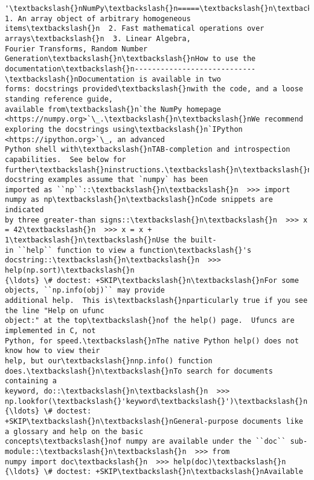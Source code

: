 \begin{tcolorbox}[breakable, size=fbox, boxrule=.5pt, pad at break*=1mm, opacityfill=0]
\begin{Verbatim}[commandchars=\\\{\}]
'\textbackslash{}nNumPy\textbackslash{}n=====\textbackslash{}n\textbackslash{}nProvides\textbackslash{}n  1. An array object of arbitrary homogeneous
items\textbackslash{}n  2. Fast mathematical operations over arrays\textbackslash{}n  3. Linear Algebra,
Fourier Transforms, Random Number Generation\textbackslash{}n\textbackslash{}nHow to use the
documentation\textbackslash{}n----------------------------\textbackslash{}nDocumentation is available in two
forms: docstrings provided\textbackslash{}nwith the code, and a loose standing reference guide,
available from\textbackslash{}n`the NumPy homepage <https://numpy.org>`\_.\textbackslash{}n\textbackslash{}nWe recommend
exploring the docstrings using\textbackslash{}n`IPython <https://ipython.org>`\_, an advanced
Python shell with\textbackslash{}nTAB-completion and introspection capabilities.  See below for
further\textbackslash{}ninstructions.\textbackslash{}n\textbackslash{}nThe docstring examples assume that `numpy` has been
imported as ``np``::\textbackslash{}n\textbackslash{}n  >>> import numpy as np\textbackslash{}n\textbackslash{}nCode snippets are indicated
by three greater-than signs::\textbackslash{}n\textbackslash{}n  >>> x = 42\textbackslash{}n  >>> x = x + 1\textbackslash{}n\textbackslash{}nUse the built-
in ``help`` function to view a function\textbackslash{}'s docstring::\textbackslash{}n\textbackslash{}n  >>> help(np.sort)\textbackslash{}n
{\ldots} \# doctest: +SKIP\textbackslash{}n\textbackslash{}nFor some objects, ``np.info(obj)`` may provide
additional help.  This is\textbackslash{}nparticularly true if you see the line "Help on ufunc
object:" at the top\textbackslash{}nof the help() page.  Ufuncs are implemented in C, not
Python, for speed.\textbackslash{}nThe native Python help() does not know how to view their
help, but our\textbackslash{}nnp.info() function does.\textbackslash{}n\textbackslash{}nTo search for documents containing a
keyword, do::\textbackslash{}n\textbackslash{}n  >>> np.lookfor(\textbackslash{}'keyword\textbackslash{}')\textbackslash{}n  {\ldots} \# doctest:
+SKIP\textbackslash{}n\textbackslash{}nGeneral-purpose documents like a glossary and help on the basic
concepts\textbackslash{}nof numpy are available under the ``doc`` sub-module::\textbackslash{}n\textbackslash{}n  >>> from
numpy import doc\textbackslash{}n  >>> help(doc)\textbackslash{}n  {\ldots} \# doctest: +SKIP\textbackslash{}n\textbackslash{}nAvailable

\end{Verbatim}
\end{tcolorbox}
